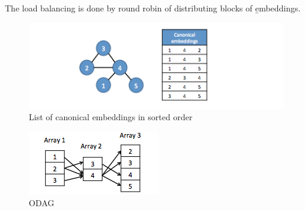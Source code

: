 \documentclass[twoside]{article}
\begin{document}
The load balancing is done by round robin of distributing blocks of \b embeddings. 

\begin{figure}[ht]
  \centering
  \includegraphics[width=0.7\linewidth]{embeddings}
  \caption{List of canonical embeddings in sorted order}
  \vspace{-0.2cm}
  \label{fig:blockdiagram}
  \vspace{-0.2cm}
\end{figure}

\begin{figure}[ht]
  \centering
  \includegraphics[width=0.7\linewidth]{odag}
  \caption{ODAG}
  \vspace{-0.2cm}
  \label{fig:blockdiagram}
  \vspace{-0.2cm}
\end{figure}

 
\end{document}
